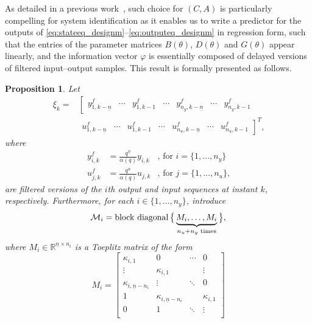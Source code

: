 \documentclass{tufte-handout}
\def\R{\mathbb{R}}
\DeclareMathOperator{\blkdiag}{block\ diagonal}
\newtheorem{proposition}[theorem]{Proposition}
\begin{document}
As detailed in a previous work~\cite{Romano:2015}, such choice for $(C,A)$ is particularly compelling for system identification as it enables us to write a predictor for the outputs of \eqref{eq:stateeq_designm}--\eqref{eq:outputeq_designm} in regression form, such that the entries of the parameter matrices $B(\theta)$, $D(\theta)$ and $G(\theta)$ appear linearly, and the information vector $\varphi$ is essentially composed of delayed versions of filtered input--output samples. This result is formally presented as follows.
%
\begin{proposition}
Let
\begin{align}
\xi_k = & \left[%
\begin{matrix} y_{1,k-\underline{n}}^f & \cdots & y_{1,k-1}^f & \cdots & y_{n_y,k-\underline{n}}^f & \cdots & y_{n_y,k-1}^f \end{matrix} \right. \nonumber \\
& \left. \begin{matrix} u_{1,k-\underline{n}}^f & \cdots & u_{1,k-1}^f & \cdots & u_{n_u,k-\underline{n}}^f & \cdots & u_{n_u,k-1}^f \end{matrix} \right]^T
\text{,} \label{eq:alternative_xi}
\end{align}
where
\begin{align*}
y_{i,k}^f & = \frac{q^{\underline{n}}}{\alpha(q)} y_{i,k} & \text{, for } i = \{1,\dots,n_y\} \\
u_{j,k}^f & = \frac{q^{\underline{n}}}{\alpha(q)} u_{j,k} & \text{, for } j = \{1,\dots,n_u\} \text{,}
\end{align*}
are filtered versions of the $i$th output and input sequences at instant $k$, respectively.
%
Furthermore, for each $i \in \{1, \ldots, n_y\}$, introduce
\begin{equation*}
\mathcal{M}_i = \blkdiag \big\{ \underbrace{M_i, \ldots, M_i}_{n_u + n_y \text{ \normalfont times}} \big\}, %
\end{equation*}
where $M_i \in \R^{\underline{n} \times n_i} $ is a Toeplitz matrix of the form
\begin{equation*}
M_i = \begin{bmatrix}
\kappa_{i,1}	& 0 			& \cdots	& 0	\\
\vdots			& \kappa_{i,1} 	&				& \vdots		\\
\kappa_{i,\underline{n}-n_i}	&	\vdots &	\ddots & 0 \\
1	& \kappa_{i,\underline{n}-n_i} & & \kappa_{i,1} \\
0 & 1 & \ddots & \vdots \\

\end{bmatrix}
\end{equation*}
\end{proposition}
\end{document}

